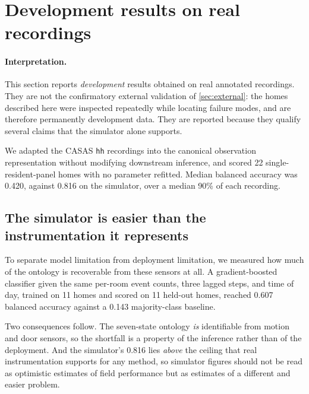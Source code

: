 \documentclass[11pt]{article}
\begin{document}


\section{Development results on real recordings}
\label{sec:realdev}

\paragraph{Interpretation.}
This section reports \emph{development} results obtained on real annotated
recordings. They are not the confirmatory external validation of
\cref{sec:external}: the homes described here were inspected repeatedly while
locating failure modes, and are therefore permanently development data. They are
reported because they qualify several claims that the simulator alone supports.

We adapted the CASAS \texttt{hh} recordings into the canonical observation
representation without modifying downstream inference, and scored 22
single-resident-panel homes with no parameter refitted. Median balanced accuracy
was 0.420, against 0.816 on the simulator, over a median 90\% of each recording.

\subsection{The simulator is easier than the instrumentation it represents}

To separate model limitation from deployment limitation, we measured how much of
the ontology is recoverable from these sensors at all. A gradient-boosted
classifier given the same per-room event counts, three lagged steps, and time of
day, trained on 11 homes and scored on 11 held-out homes, reached 0.607 balanced
accuracy against a 0.143 majority-class baseline.

Two consequences follow. The seven-state ontology \emph{is} identifiable from
motion and door sensors, so the shortfall is a property of the inference rather
than of the deployment. And the simulator's 0.816 lies \emph{above} the ceiling
that real instrumentation supports for any method, so simulator figures should
not be read as optimistic estimates of field performance but as estimates of a
different and easier problem.
\end{document}
